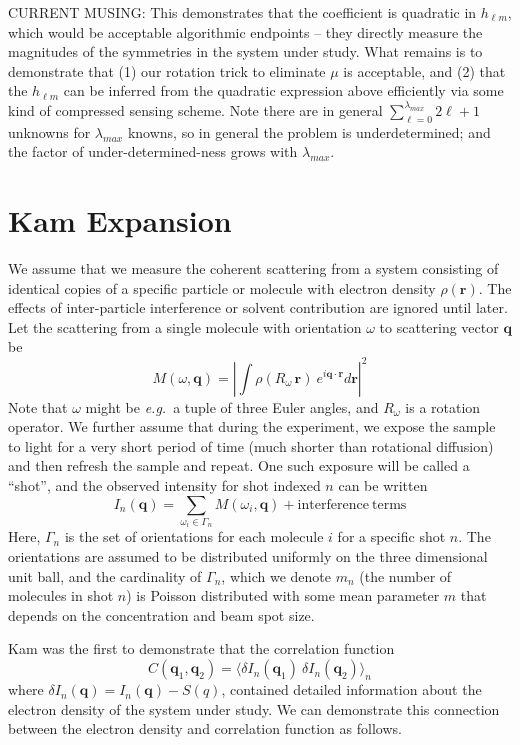 \documentclass[aps,prl,preprint,groupedaddress]{revtex4-1}
\def\*#1{\mathbf{#1}}
\begin{document}
CURRENT MUSING: This demonstrates that the coefficient is quadratic in $h_{\ell m}$, which would be acceptable algorithmic endpoints -- they directly measure the magnitudes of the symmetries in the system under study. What remains is to demonstrate that (1) our rotation trick to eliminate $\mu$ is acceptable, and (2) that the $h_{\ell m}$ can be inferred from the quadratic expression above efficiently via some kind of compressed sensing scheme. Note there are in general $\sum_{\ell = 0}^{\lambda_{max}} 2 \ell + 1$ unknowns for $\lambda_{max}$ knowns, so in general the problem is underdetermined; and the factor of under-determined-ness grows with $\lambda_{max}$.

\section{Kam Expansion}

We assume that we measure the coherent scattering from a system consisting of identical copies of a specific particle or molecule with electron density $\rho(\*{r})$. The effects of inter-particle interference or solvent contribution are ignored until later. Let the scattering from a single molecule with orientation $\omega$ to scattering vector $\*{q}$ be
\begin{equation} \label{molecular-scattering}
M( \omega, \*{q} ) = \left| \int \rho(R_\omega \, \*{r}) \> e^{ i \*{q} \cdot \*{r} } d\*r \right|^2
\end{equation}
Note that $\omega$ might be \textit{e.g.}~a tuple of three Euler angles, and $R_\omega$ is a rotation operator. We further assume that during the experiment, we expose the sample to light for a very short period of time (much shorter than rotational diffusion) and then refresh the sample and repeat. One such exposure will be called a ``shot'', and the observed intensity for shot indexed $n$ can be written
\[
I_n ( \*q ) = \sum_{\omega_i \in \Gamma_n} M( \omega_i, \*{q} ) + \mathrm{interference\ terms}
\]
Here, $\Gamma_n$ is the set of orientations for each molecule $i$ for a specific shot $n$. The orientations are assumed to be distributed uniformly on the three dimensional unit ball, and the cardinality of $\Gamma_n$, which we denote $m_n$ (the number of molecules in shot $n$) is Poisson distributed with some mean parameter $m$ that depends on the concentration and beam spot size.

Kam was the first to demonstrate that the correlation function
\begin{equation}\label{correlation}
C( \*q_1, \*q_2 ) = \big\langle \delta I_n ( \*q_1 ) \> \delta I_n ( \*q_2 ) \big\rangle_n
\end{equation}
where $\delta I_n ( \*q ) = I_n ( \*q ) - S( q )$, contained detailed information about the electron density of the system under study. We can demonstrate this connection between the electron density and correlation function as follows.
\end{document}
